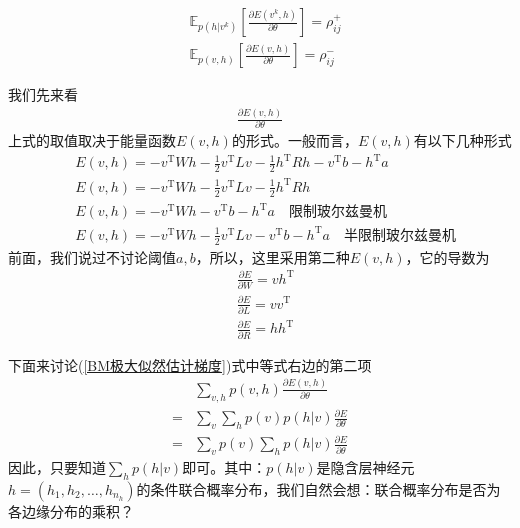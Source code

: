             \begin{align*}
            & \mathbb{E}_{p(h|v^k)} \left[ \frac{\partial E(v^k,h)}{\partial \theta} \right] = \rho_{ij}^+\\
            & \mathbb{E}_{p(v,h)} \left[ \frac{\partial E(v,h)}{\partial \theta}  \right] = \rho_{ij}^-
            \end{align*}
            \par
            我们先来看
            \begin{align*}
            \frac{\partial E(v,h)}{\partial \theta}
            \end{align*}
            上式的取值取决于能量函数$E(v,h)$的形式。一般而言，$E(v,h)$有以下几种形式
            \begin{align*}
            & E(v,h) = -v^\mathrm{T}Wh - \frac{1}{2}v^\mathrm{T}Lv - \frac{1}{2}h^\mathrm{T}Rh - v^\mathrm{T}b-h^\mathrm{T}a\\
            & E(v,h) = -v^\mathrm{T}Wh - \frac{1}{2}v^\mathrm{T}Lv - \frac{1}{2}h^\mathrm{T}Rh\\
            & E(v,h) = -v^\mathrm{T}Wh - v^\mathrm{T}b-h^\mathrm{T}a \quad \text{限制玻尔兹曼机}\\
            & E(v,h) = -v^\mathrm{T}Wh - \frac{1}{2}v^\mathrm{T}Lv - v^\mathrm{T}b-h^\mathrm{T}a\quad\text{半限制玻尔兹曼机}
            \end{align*}
            前面，我们说过不讨论阈值$a,b$，所以，这里采用第二种$E(v,h)$，它的导数为
            \begin{align*}
            & \frac{\partial E}{\partial W} = vh^\mathrm{T}\\
            & \frac{\partial E}{\partial L} = vv^\mathrm{T}\\
            & \frac{\partial E}{\partial R} = hh^\mathrm{T}
            \end{align*}
            \par
            下面来讨论(\ref{BM极大似然估计梯度})式中等式右边的第二项
            \begin{align*}
            &\sum_{v,h}p(v,h) \frac{\partial E(v,h)}{\partial \theta}\\
            = {}&\sum_v\sum_h p(v)p(h|v)\frac{\partial E}{\partial \theta}\\
            = {}&\sum_vp(v)\sum_hp(h|v)\frac{\partial E}{\partial \theta}
            \end{align*}
            因此，只要知道$\sum_hp(h|v)$即可。其中：$p(h|v)$是隐含层神经元$h = (h_1,h_2,\dots,h_{n_h})$的条件联合概率分布，我们自然会想：联合概率分布是否为各边缘分布的乘积？
